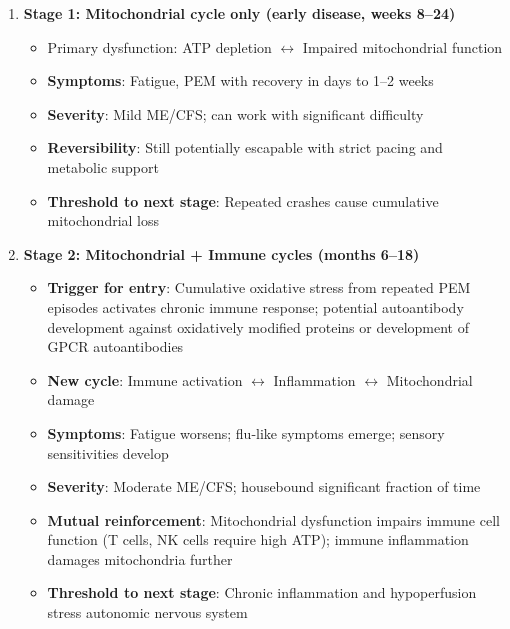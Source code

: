 \begin{enumerate}
    \item \textbf{Stage 1: Mitochondrial cycle only (early disease, weeks 8--24)}
    \begin{itemize}
        \item Primary dysfunction: ATP depletion $\leftrightarrow$ Impaired mitochondrial function
        \item \textbf{Symptoms}: Fatigue, PEM with recovery in days to 1--2 weeks
        \item \textbf{Severity}: Mild ME/CFS; can work with significant difficulty
        \item \textbf{Reversibility}: Still potentially escapable with strict pacing and metabolic support
        \item \textbf{Threshold to next stage}: Repeated crashes cause cumulative mitochondrial loss
    \end{itemize}

    \item \textbf{Stage 2: Mitochondrial + Immune cycles (months 6--18)}
    \begin{itemize}
        \item \textbf{Trigger for entry}: Cumulative oxidative stress from repeated PEM episodes activates chronic immune response; potential autoantibody development against oxidatively modified proteins or development of GPCR autoantibodies
        \item \textbf{New cycle}: Immune activation $\leftrightarrow$ Inflammation $\leftrightarrow$ Mitochondrial damage
        \item \textbf{Symptoms}: Fatigue worsens; flu-like symptoms emerge; sensory sensitivities develop
        \item \textbf{Severity}: Moderate ME/CFS; housebound significant fraction of time
        \item \textbf{Mutual reinforcement}: Mitochondrial dysfunction impairs immune cell function (T cells, NK cells require high ATP); immune inflammation damages mitochondria further
        \item \textbf{Threshold to next stage}: Chronic inflammation and hypoperfusion stress autonomic nervous system
    \end{itemize}


\end{enumerate}
